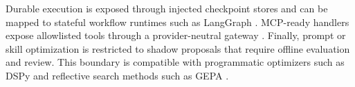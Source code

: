 Durable execution is exposed through injected checkpoint stores and can be mapped to stateful workflow runtimes such as LangGraph \cite{langgraph2026}. MCP-ready handlers expose allowlisted tools through a provider-neutral gateway \cite{mcp2026}. Finally, prompt or skill optimization is restricted to shadow proposals that require offline evaluation and review. This boundary is compatible with programmatic optimizers such as DSPy and reflective search methods such as GEPA \cite{khattab2024dspy,agrawal2026gepa}.